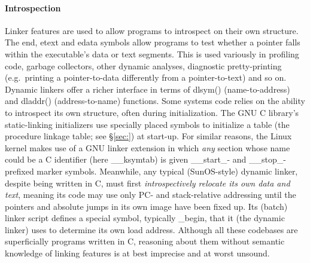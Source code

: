 \paragraph{Introspection}
Linker features are used to allow programs to introspect on their own structure.
The \textsf{end}, \textsf{etext} and \textsf{edata} symbols 
allow programs to test whether a pointer falls within the 
executable's data or text segments. 
This is used variously in profiling code, garbage collectors,
other dynamic analyses, diagnostic pretty-printing 
(e.g.\ printing a pointer-to-data differently from a pointer-to-text)
and so on.
Dynamic linkers offer a richer interface 
in terms of \textsf{dlsym()} (name-to-address) and \textsf{dladdr()} (address-to-name) functions.
Some systems code relies on the ability to introspect its own structure,
often during initialization.
The GNU C library's static-linking initializers 
use specially placed symbols to initialize a table (the procedure linkage table; see \S\ref{sec:})
at start-up.
For similar reasons, the Linux kernel 
makes use of a GNU linker extension in which \emph{any}
section whose name could be a C identifier (here \textsf{\_\_ksymtab})
is given \textsf{\_\_start\_}- and \textsf{\_\_stop\_}-prefixed
marker symbols.
Meanwhile, any typical (SunOS-style) dynamic linker, despite being written in C,
must first \emph{introspectively relocate its own data and text}, 
meaning its code may use only PC- and stack-relative addressing
until the pointers and absolute jumps in its own image
have been fixed up.
Its (batch) linker script defines a special symbol, typically \textsf{\_begin}, 
that it (the dynamic linker) uses to determine its own load address.
Although all these codebases are superficially 
programs written in C, reasoning about them
without semantic knowledge of linking features 
is at best imprecise and at worst unsound.


%
%

